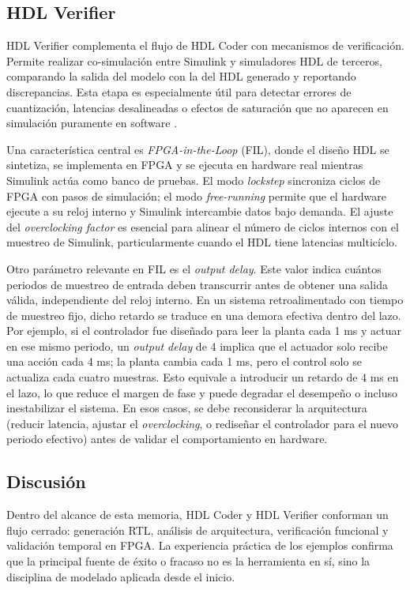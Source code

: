 \subsection{HDL Verifier}

HDL Verifier complementa el flujo de HDL Coder con mecanismos de verificación. Permite realizar co-simulación entre Simulink y simuladores HDL de terceros, comparando la salida del modelo con la del HDL generado y reportando discrepancias. Esta etapa es especialmente útil para detectar errores de cuantización, latencias desalineadas o efectos de saturación que no aparecen en simulación puramente en software \cite{matlabHDLVerifier}.

Una característica central es \textit{FPGA-in-the-Loop} (FIL), donde el diseño HDL se sintetiza, se implementa en FPGA y se ejecuta en hardware real mientras Simulink actúa como banco de pruebas. El modo \textit{lockstep} sincroniza ciclos de FPGA con pasos de simulación; el modo \textit{free-running} permite que el hardware ejecute a su reloj interno y Simulink intercambie datos bajo demanda. El ajuste del \textit{overclocking factor} es esencial para alinear el número de ciclos internos con el muestreo de Simulink, particularmente cuando el HDL tiene latencias multicíclo.

Otro parámetro relevante en FIL es el \textit{output delay}. Este valor indica cuántos periodos de muestreo de entrada deben transcurrir antes de obtener una salida válida, independiente del reloj interno. En un sistema retroalimentado con tiempo de muestreo fijo, dicho retardo se traduce en una demora efectiva dentro del lazo. Por ejemplo, si el controlador fue diseñado para leer la planta cada 1 ms y actuar en ese mismo periodo, un \textit{output delay} de 4 implica que el actuador solo recibe una acción cada 4 ms; la planta cambia cada 1 ms, pero el control solo se actualiza cada cuatro muestras. Esto equivale a introducir un retardo de 4 ms en el lazo, lo que reduce el margen de fase y puede degradar el desempeño o incluso inestabilizar el sistema. En esos casos, se debe reconsiderar la arquitectura (reducir latencia, ajustar el \textit{overclocking}, o rediseñar el controlador para el nuevo periodo efectivo) antes de validar el comportamiento en hardware.

\subsection{Discusión}

Dentro del alcance de esta memoria, HDL Coder y HDL Verifier conforman un flujo cerrado: generación RTL, análisis de arquitectura, verificación funcional y validación temporal en FPGA. La experiencia práctica de los ejemplos confirma que la principal fuente de éxito o fracaso no es la herramienta en sí, sino la disciplina de modelado aplicada desde el inicio.


